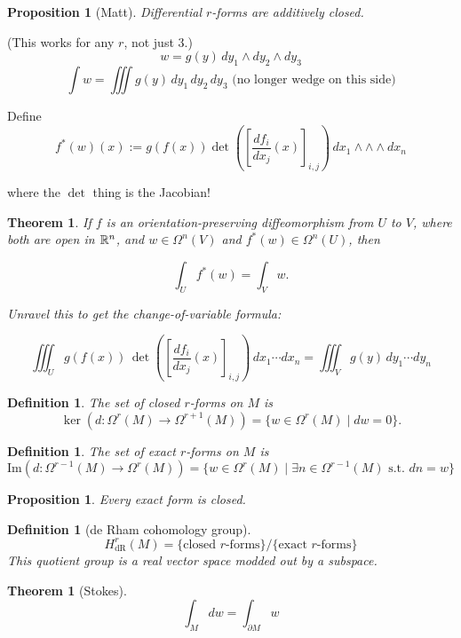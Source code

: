 \documentclass[11pt]{amsbook}
\theoremstyle{mystyle} \newtheorem{thrm}[thm]{Theorem}
\theoremstyle{mystyle} \newtheorem{defi}[thm]{Definition}
\theoremstyle{mystyle} \newtheorem{coro}[thm]{Corollary}
\theoremstyle{mystyle} \newtheorem{propo}[thm]{Proposition}
\theoremstyle{mystyle} \newtheorem{lemm}[thm]{Lemma}
\numberwithin{thm}{section}
\newcommand{\de}{\emph}
\begin{document}
\begin{propo}[Matt]
	Differential $r$-forms are additively closed.
\end{propo}

\begin{example}[integration]	%
	(This works for any $r$, not just 3.)
	$$w = g(y) \,dy_1  \wedge  dy_2  \wedge  dy_3$$	%
	$$\int w = \iiint g(y) \,dy_1 \,dy_2 \,dy_3 \text{ (no longer wedge on this side)}$$	%

	Define
	$$f^*(w)(x) := g(f(x)) \det\left(\left[\frac{df_i}{dx_j}(x)\right]_{i,j}\right) \,dx_1  \wedge  \wedge  \wedge  dx_n$$

	where the $\det$ thing is the Jacobian!
\end{example}

\begin{thrm}
	If $f$ is an orientation-preserving diffeomorphism from $U$ to $V$, where both are open in ${\mathbb R}^n$,
	and $w \in \Omega^n(V)$ and
	$f^*(w) \in \Omega^n(U)$,
	then

	$$\int_U f^*(w) = \int_V w.$$

	Unravel this to get the change-of-variable formula:

	$$\iiint_U g(f(x)) \,\det\left(\left[\frac{df_i}{dx_j}(x)\right]_{i,j}\right) \,dx_1 \cdots dx_n = \iiint_V g(y) \,dy_1 \cdots dy_n$$
\end{thrm}

\begin{defi}
	The set of \de{closed $r$-forms} on $M$ is $$ \ker(d: \Omega^r(M) \to \Omega^{r+1}(M) ) = \{ w \in \Omega^r(M) \mid dw = 0 \}.  $$
\end{defi}

\begin{defi}
	The set of \de{exact $r$-forms} on $M$ is $$ \text{Im}(d: \Omega^{r-1}(M) \to \Omega^r(M) ) = \{ w \in \Omega^r(M) \mid \exists n \in \Omega^{r-1}(M) \text{ s.t. } dn = w \}  $$
\end{defi}

\begin{propo}
	Every exact form is closed.
\end{propo}

\begin{defi}[de Rham cohomology group]
	$$H^r_\text{dR}(M) = \text{\{closed $r$-forms\}/\{exact $r$-forms\}}$$ %
	This quotient group is a real vector space modded out by a subspace.
\end{defi}

\begin{thrm}[Stokes]
	$$\int_M dw = \int_{\partial M} w$$
\end{thrm}
\end{document}
